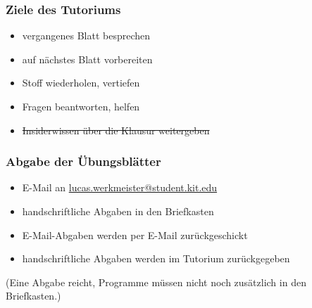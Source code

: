 \documentclass{beamer}
\date{2016-10-24/25}
\begin{document}
\normalsize
\normalem

\begin{frame}[plain]
  \titlepage
\end{frame}

\begin{frame}
  \frametitle{Ziele des Tutoriums}
  \pause
  \begin{itemize}
  \item vergangenes Blatt besprechen
  \item auf nächstes Blatt vorbereiten
  \item Stoff wiederholen, vertiefen
  \item Fragen beantworten, helfen
  \item \sout{Insiderwissen über die Klausur weitergeben}
  \end{itemize}
\end{frame}

\begin{frame}
  \frametitle{Abgabe der Übungsblätter}
  \begin{itemize}
  \item E-Mail an \href{mailto:lucas.werkmeister@student.kit.edu?subject=[PP2016] Blatt X, MN 1234567}{lucas.werkmeister@student.kit.edu}
  \item handschriftliche Abgaben in den Briefkasten
  \item E-Mail-Abgaben werden per E-Mail zurückgeschickt
  \item handschriftliche Abgaben werden im Tutorium zurückgegeben
  \end{itemize}
  (Eine Abgabe reicht, Programme müssen nicht noch zusätzlich in den Briefkasten.)
\end{frame}
\end{document}
